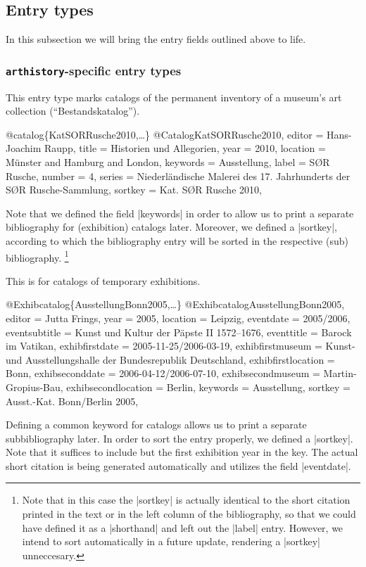 \documentclass[a4paper,
10pt,
ngerman,
english
]{ltxdoc}
\begin{document}
\subsection{Entry types}

In this subsection we will bring the entry fields outlined above to life.

\subsubsection{\texttt{arthistory}-specific entry types}\label{sec:arth-etypes}

This entry type marks catalogs of the permanent inventory of a museum's art collection (\enquote{Bestandskatalog}).
\begin{bibexample}[label=KatSORRusche2010]{{@}catalog\{KatSORRusche2010,…\}}
@Catalog{KatSORRusche2010,
  editor   = {Hans-Joachim Raupp},
  title    = {Historien und Allegorien},
  year     = {2010},
  location = {Münster and Hamburg and London},
  keywords = {Ausstellung},
  label    = {S{{\O}}R Rusche},
  number   = {4},
  series   = {Niederländische Malerei des 17. Jahrhunderts der S{{\O}}R Rusche-Sammlung},
  sortkey  = {Kat. S{{\O}}R Rusche 2010},
}
\end{bibexample}
Note that we defined the field |keywords| in order to allow us to print a separate bibliography for (exhibition) catalogs later.
Moreover, we defined a |sortkey|, according to which the bibliography entry will be sorted in the respective (sub) bibliography.%
\footnote{Note that in this case the |sortkey| is actually identical to the short citation printed in the text or in the left column of the bibliography, so that we could have defined it as a |shorthand| and left out the |label| entry. However, we intend to sort automatically in a future update, rendering a |sortkey| unneccesary.}

This is for catalogs of temporary exhibitions.
\begin{bibexample}[label=AusstellungBonn2005]{{@}Exhibcatalog\{AusstellungBonn2005,…\}}
@Exhibcatalog{AusstellungBonn2005,
  editor          = {Jutta Frings},
  year            = {2005},
  location        = {Leipzig},
  eventdate       = {2005/2006},
  eventsubtitle   = {Kunst und Kultur der Päpste II 1572--1676},
  eventtitle      = {Barock im Vatikan},
  exhibfirstdate  = {2005-11-25/2006-03-19},
  exhibfirstmuseum = {Kunst- und Ausstellungshalle der Bundesrepublik Deutschland},
  exhibfirstlocation = {Bonn},
  exhibseconddate = {2006-04-12/2006-07-10},
  exhibsecondmuseum = {Martin-Gropius-Bau},
  exhibsecondlocation = {Berlin},
  keywords        = {Ausstellung},
  sortkey         = {Ausst.-Kat. Bonn/Berlin 2005},
}
\end{bibexample}
Defining a common keyword for catalogs allows us to print a separate subbibliography later. In order to sort the entry properly, we defined a |sortkey|. Note that it suffices to include but the first exhibition year in the key. The actual short citation is being generated automatically and utilizes the field |eventdate|.
\end{document}
